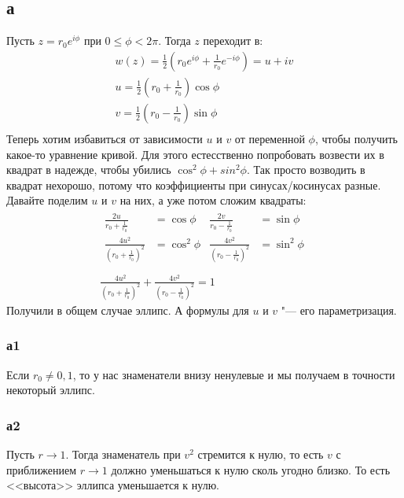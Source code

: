 	\subsection{а}
		Пусть $z=r_0e^{i\phi}$ при $0 \le \phi < 2\pi$.
		Тогда $z$ переходит в:
		\begin{gather*}\label{day160310_task1a_uv}
			w(z) = \frac12 \left(r_0e^{i\phi}+\frac1{r_0} e^{-i\phi}\right) = u+iv \\
			u = \frac12 \left(r_0+\frac1{r_0}\right) \cos \phi \\
			v = \frac12 \left(r_0-\frac1{r_0}\right) \sin \phi \\
		\end{gather*}
		Теперь хотим избавиться от зависимости $u$ и $v$ от переменной $\phi$,
		чтобы получить какое-то уравнение кривой.
		Для этого естесственно попробовать возвести их в квадрат в надежде, чтобы убились $\cos^2\phi + sin^2\phi$.
		Так просто возводить в квадрат нехорошо, потому что коэффициенты при синусах/косинусах разные.
		Давайте поделим $u$ и $v$ на них, а уже потом сложим квадраты:
		\begin{gather*}
			\begin{aligned}
				\frac{2u}{r_0+\frac1{r_0}} &= \cos \phi &
				\frac{2v}{r_0-\frac1{r_0}} &= \sin \phi \\
				\frac{4u^2}{\left(r_0+\frac1{r_0}\right)^2} &= \cos^2 \phi &
				\frac{4v^2}{\left(r_0-\frac1{r_0}\right)^2} &= \sin^2 \phi \\
			\end{aligned} \\
			\frac{4u^2}{\left(r_0+\frac1{r_0}\right)^2} +
			\frac{4v^2}{\left(r_0-\frac1{r_0}\right)^2} = 1
		\end{gather*}
		Получили в общем случае эллипс.
		А формулы для $u$ и $v$ "--- его параметризация.
		
		\subsubsection{а1}
			Если $r_0 \neq 0, 1$, то у нас знаменатели внизу ненулевые и мы получаем в точности некоторый эллипс.

		\subsubsection{а2}
			Пусть $r \to 1$.
			Тогда знаменатель при $v^2$ стремится к нулю, то есть $v$ с приближением $r \to 1$
			должно уменьшаться к нулю сколь угодно близко.
			То есть <<высота>> эллипса уменьшается к нулю.

